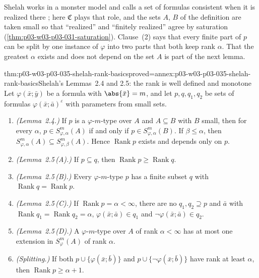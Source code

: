 Shelah works in a monster model and calls a set of formulas consistent when
it is realized there \cite[Lemma~2.7, p.~301]{Shelah1971Stability}; here
\(\mathfrak C\) plays that role, and the sets \(A\), \(B\) of the definition
are taken small so that ``realized'' and ``finitely realized'' agree by
saturation (\cref{thm:p03-w03-p03-031-saturation}).  Clause~(2) says that
every finite part of \(p\) can be split by one instance of \(\varphi\) into
two parts that both keep rank \(\alpha\).  That the greatest \(\alpha\)
exists and does not depend on the set \(A\) is part of the next lemma.

\begin{hblemma}{thm:p03-w03-p03-035-shelah-rank-basics}{proved=annex:p03-w03-p03-035-shelah-rank-basics}{Shelah's Lemmas~2.4 and 2.5: the rank is well defined and monotone}
Let \(\varphi(\bar x;\bar y)\) be a formula with \(\abs{\bar x}=m\), and let
\(p,q,q_1,q_2\) be sets of formulas \(\varphi(\bar x;\bar a)^{\varepsilon}\)
with parameters from small sets.
\begin{enumerate}
  \item \emph{(Lemma~2.4.)}  If \(p\) is a \(\varphi\)-\(m\)-type over \(A\)
        and \(A\subseteq B\) with \(B\) small, then for every \(\alpha\),
        \(p\in S^m_{\varphi,\alpha}(A)\) if and only if
        \(p\in S^m_{\varphi,\alpha}(B)\).  If \(\beta\leq\alpha\), then
        \(S^m_{\varphi,\alpha}(A)\subseteq S^m_{\varphi,\beta}(A)\).
        Hence \(\operatorname{Rank}p\) exists and depends only on \(p\).
  \item \emph{(Lemma~2.5\,(A).)}  If \(p\subseteq q\), then
        \(\operatorname{Rank}p\geq\operatorname{Rank}q\).
  \item \emph{(Lemma~2.5\,(B).)}  Every \(\varphi\)-\(m\)-type \(p\) has a
        finite subset \(q\) with \(\operatorname{Rank}q=\operatorname{Rank}p\).
  \item \emph{(Lemma~2.5\,(C).)}  If \(\operatorname{Rank}p=\alpha<\infty\),
        there are no \(q_1,q_2\supseteq p\) and \(\bar a\) with
        \(\operatorname{Rank}q_1=\operatorname{Rank}q_2=\alpha\),
        \(\varphi(\bar x;\bar a)\in q_1\) and
        \(\neg\varphi(\bar x;\bar a)\in q_2\).
  \item \emph{(Lemma~2.5\,(D).)}  A \(\varphi\)-\(m\)-type over \(A\) of
        rank \(\alpha<\infty\) has at most one extension in
        \(S^m_\varphi(A)\) of rank \(\alpha\).
  \item \emph{(Splitting.)}  If both \(p\cup\{\varphi(\bar x;\bar b)\}\) and
        \(p\cup\{\neg\varphi(\bar x;\bar b)\}\) have rank at least
        \(\alpha\), then \(\operatorname{Rank}p\geq\alpha+1\).
\end{enumerate}
\end{hblemma}


